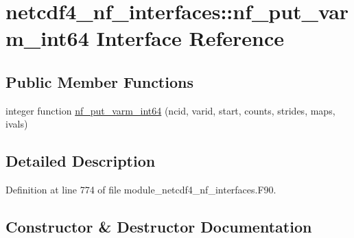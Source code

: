 \hypertarget{interfacenetcdf4__nf__interfaces_1_1nf__put__varm__int64}{}\section{netcdf4\+\_\+nf\+\_\+interfaces\+:\+:nf\+\_\+put\+\_\+varm\+\_\+int64 Interface Reference}
\label{interfacenetcdf4__nf__interfaces_1_1nf__put__varm__int64}
\subsection*{Public Member Functions}
\begin{DoxyCompactItemize}
\item 
integer function \hyperlink{interfacenetcdf4__nf__interfaces_1_1nf__put__varm__int64_a80b5567b5c7b84bd1ee98d4739fe97df}{nf\+\_\+put\+\_\+varm\+\_\+int64} (ncid, varid, start, counts, strides, maps, ivals)
\end{DoxyCompactItemize}


\subsection{Detailed Description}


Definition at line 774 of file module\+\_\+netcdf4\+\_\+nf\+\_\+interfaces.\+F90.



\subsection{Constructor \& Destructor Documentation}
\mbox{\label{interfacenetcdf4__nf__interfaces_1_1nf__put__varm__int64_a80b5567b5c7b84bd1ee98d4739fe97df}} 
